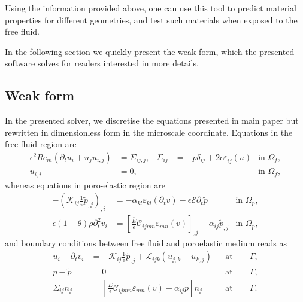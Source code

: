 \documentclass[12pt,a4paper]{article}
\newcommand{\pdt}{\partial_t}
\newcommand{\str}[3]{\varepsilon^{#1}_{#2} \left( #3 \right)}
\newcommand{\ord}{\epsilon}
\begin{document}
Using the information provided above, one can use this tool to predict material properties for different geometries, and test such materials when exposed to the free fluid.

In the following section we quickly present the weak form, which the presented software solves for readers interested in more details.

\subsection{Weak form}

In the presented solver, we discretise the equations presented in main paper but rewritten in dimensionless form in the microscale coordinate. Equations in the free fluid region are
\begin{align}
\ord^2 Re_m \left( \pdt u_i  + u_j u_{i,j} \right) & = \Sigma_{ij,j}, &  \Sigma_{ij} & = -p \delta_{ij} + 2 \ord \str{}{ij}{u}  & \mbox{in } \Omega_f, \\
u_{i,i} & = 0, & &  & \mbox{in } \Omega_f, 
\end{align}
whereas equations in poro-elastic region are
\begin{align}
- \left( \mathcal{K}_{ij} \frac{1}{\ord} \tilde{p}_{,j} \right)_{,i} & = - \alpha_{kl} \str{}{kl}{ \pdt v }  - \ord \mathcal{E} \pdt \tilde{p}   & \mbox{in } \Omega_p,\\
\ord \left(1 - \theta \right) \bar{\bar{\rho}} \pdt^2 v_i & = \left[ \frac{\bar{\bar{E}}}{\ord} \mathcal{C}_{ijmn} \str{}{mn}{ v } \right]_{,j} - \alpha_{ij} \tilde{p}_{,j}   & \mbox{in } \Omega_p,
\end{align}
and boundary conditions between free fluid and poroelastic medium reads as
\begin{align}
u_i - \pdt v_i & =  - \mathcal{\bar{K}}_{ij} \frac{1}{\ord} \tilde{p}_{,j} + \mathcal{\bar{L}}_{ijk} \left( u_{j,k} + u_{k,j} \right)  & & \textrm{at}\qquad \Gamma, \\
p - \tilde{p} & = 0  & & \textrm{at}\qquad \Gamma, \\
\Sigma_{ij} n_j & = \left[ \frac{\bar{\bar{E}}}{\ord} \mathcal{C}_{ijmn} \str{}{mn}{ v } - \alpha_{ij} \tilde{p} \right] n_j  & & \textrm{at}\qquad \Gamma.
\end{align}
\end{document}
